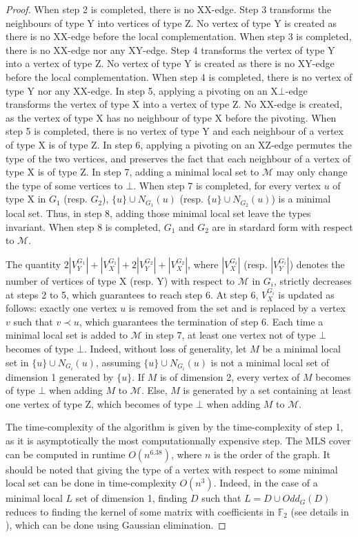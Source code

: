 \documentclass[a4paper,UKenglish,cleveref,autoref,thm-restate]{arxiv}
\begin{document}
\begin{proof}
     When step 2 is completed, there is no XX-edge. Step 3 transforms the neighbours of type Y into vertices of type Z. No vertex of type Y is created as there is no XX-edge before the local complementation. When step 3 is completed, there is no XX-edge nor any XY-edge. Step 4 transforms the vertex of type Y into a vertex of type Z. No vertex of type Y is created as there is no XY-edge before the local complementation. When step 4 is completed, there is no vertex of type Y nor any XX-edge. In step 5, applying a pivoting on an X$\bot$-edge transforms the vertex of type X into a vertex of type Z. No XX-edge is created, as the vertex of type X has no neighbour of type X before the pivoting. When step 5 is completed, there is no vertex of type Y and each neighbour of a vertex of type X is of type Z. In step 6, applying a pivoting on an XZ-edge permutes the type of the two vertices, and preserves the fact that each neighbour of a vertex of type X is of type Z. In step 7, adding a minimal local set to  $\mathcal M$ may only change the type of some vertices to $\bot$. When step 7 is completed, for every vertex $u$ of type X in $G_1$ (resp. $G_2$), $\{u\} \cup N_{G_1}(u)$ (resp.  $\{u\} \cup N_{G_2}(u)$) is a minimal local set. Thus, in step 8, adding those minimal local set leave the types invariant. When step 8 is completed, $G_1$ and $G_2$ are in stardard form with respect to $\mathcal M$.
    
     The quantity $2|V^{G_1}_Y|+|V^{G_1}_X| + 2|V^{G_2}_Y|+|V^{G_2}_X|$, where $|V^{G_i}_X|$ (resp. $|V^{G_i}_Y|$) denotes the number of vertices of type X (resp. Y) with respect to $\mathcal M$ in $G_i$, strictly decreases at steps 2 to 5, which guarantees to reach step 6. At step 6, $V^{G_i}_X$ is updated as follows: exactly one vertex $u$ is removed from the set and is replaced by a vertex $v$ such that $v\prec u$, which guarantees the termination of step 6. Each time a minimal local set is added to $\mathcal M$ in step 7, at least one vertex not of type $\bot$ becomes of type $\bot$. Indeed, without loss of generality, let $M$ be a minimal local set in $\{u\} \cup N_{G_i}(u)$, assuming $\{u\} \cup N_{G_i}(u)$ is not a minimal local set of dimension 1 generated by $\{u\}$. If $M$ is of dimension 2, every vertex of $M$ becomes of type $\bot$ when adding $M$ to $\mathcal M$. Else, $M$ is generated by a set containing at least one vertex of type Z, which becomes of type $\bot$ when adding $M$ to $\mathcal M$.

     The time-complexity of the algorithm is given by the time-complexity of step 1, as it is asymptotically the most computationnally expensive step. The MLS cover can be computed in runtime $O(n^{6.38})$, where $n$ is the order of the graph. It should be noted that giving the type of a vertex with respect to some minimal local set can be done in time-complexity $O(n^3)$. Indeed, in the case of a minimal local $L$ set of dimension 1, finding $D$ such that $L = D \cup Odd_G(D)$ reduces to finding the kernel of some matrix with coefficients in $\mathbb F_2$ (see details in \cite{claudet2024covering}), which can be done using Gaussian elimination.
\end{proof}
\end{document}
